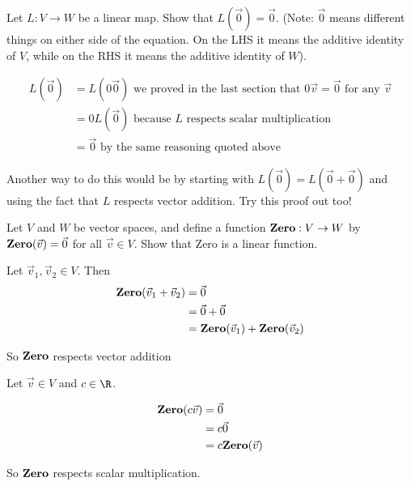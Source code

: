 \documentclass{ximera}
\begin{document}
	Let $L:V \to W$ be a linear map.  Show that $L(\vec{0}) = \vec{0}$. 
	(Note: $\vec{0}$ means different things on either side of the equation.  On the LHS it means the additive identity of $V$, while on the RHS it means the 
	additive identity of $W$).

\begin{free-response}
	\begin{align*}
		L(\vec{0}) &= L(0\vec{0}) \text{ we proved in the last section that $0\vec{v} = \vec{0}$ for any $\vec{v}$}\\
						&= 0L(\vec{0}) \text{ because $L$ respects scalar multiplication}\\
						&=\vec{0} \text{ by the same reasoning quoted above}
	\end{align*}
	
	Another way to do this would be by starting with $L(\vec{0}) = L(\vec{0}+\vec{0})$ and using the fact that $L$ respects vector addition.  Try this proof out too!
	\end{free-response}

	Let $V$ and $W$ be vector spaces, and define a function $\text{\textbf{Zero}}: V \to W$ by $\text{\textbf{Zero}}(\vec{v}) = \vec{0}$ for all $\vec{v} \in V$.  Show that 
	$\mathrm{Zero}$ is a linear function. 

\begin{free-response}
	Let $\vec{v}_1,\vec{v}_2 \in V$.  Then
	\begin{align*}
		\text{\textbf{Zero}}(\vec{v}_1+\vec{v}_2) &= \vec{0}\\
						&= \vec{0}+\vec{0}\\
						&= \text{\textbf{Zero}}(\vec{v}_1)+\text{\textbf{Zero}}(\vec{v}_2)
	\end{align*}
	
	So $\text{\textbf{Zero}}$ respects vector addition
	
	Let $\vec{v} \in V$ and $c \in \R$.
	
	\begin{align*}
		\text{\textbf{Zero}}(c\vec{v}) &= \vec{0}\\
						&= c\vec{0}\\
						&= c\text{\textbf{Zero}}(\vec{v})
	\end{align*}
	
	So $\text{\textbf{Zero}}$ respects scalar multiplication.
	
\end{free-response}
\end{document}
